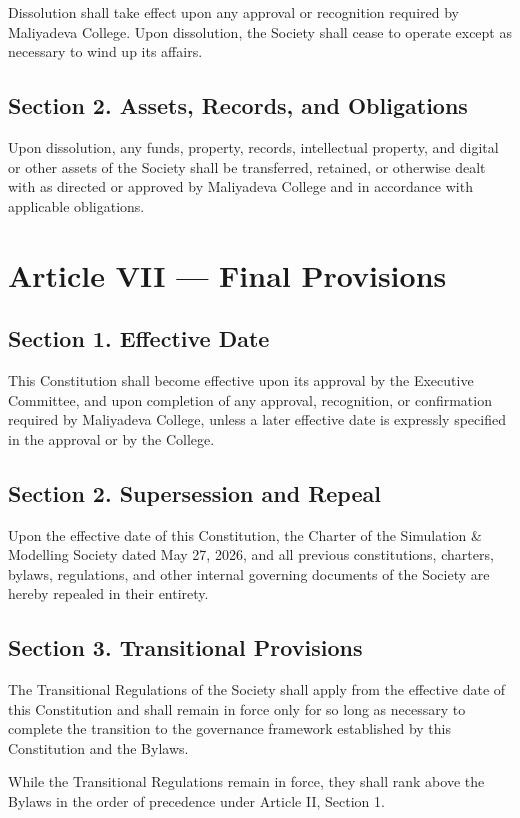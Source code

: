 \documentclass[11pt,a4paper]{article}
\begin{document}
Dissolution shall take effect upon any approval or recognition required
by Maliyadeva College. Upon dissolution, the Society shall cease to
operate except as necessary to wind up its affairs.

\subsection*{Section 2. Assets, Records, and Obligations}
Upon dissolution, any funds, property, records, intellectual property, and
digital or other assets of the Society shall be transferred, retained,
or otherwise dealt with as directed or approved by Maliyadeva College
and in accordance with applicable obligations.

\section*{Article VII --- Final Provisions}

\subsection*{Section 1. Effective Date}
This Constitution shall become effective upon its approval by the Executive Committee, and upon completion of any approval, recognition, or confirmation required by Maliyadeva College, unless a later effective date is expressly specified in the approval or by the College.

\subsection*{Section 2. Supersession and Repeal}
Upon the effective date of this Constitution, the Charter of the Simulation \& Modelling Society dated May 27, 2026, and all previous constitutions, charters, bylaws, regulations, and other internal governing documents of the Society are hereby repealed in their entirety.

\subsection*{Section 3. Transitional Provisions}
The Transitional Regulations of the Society shall apply from the effective date of this Constitution and shall remain in force only for so long as necessary to complete the transition to the governance framework established by this Constitution and the Bylaws.

While the Transitional Regulations remain in force, they shall rank above the Bylaws in the order of precedence under Article II, Section 1.
\end{document}
